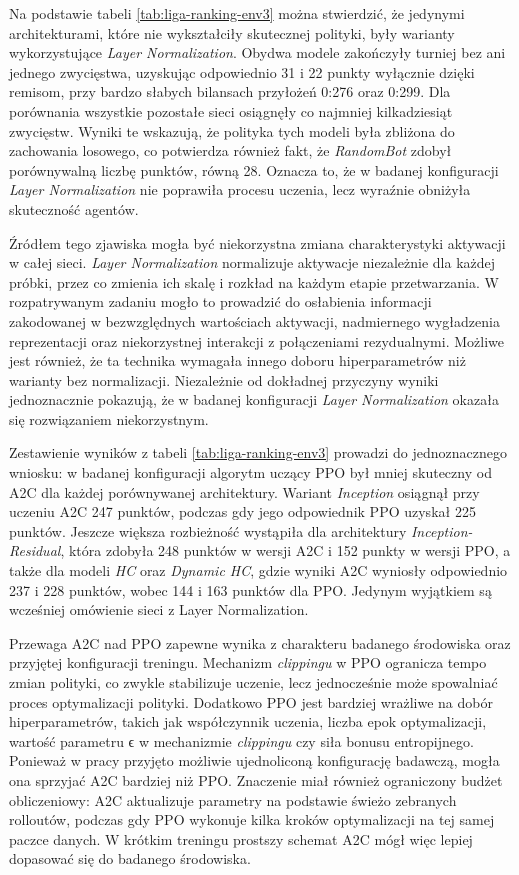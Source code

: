 Na podstawie tabeli \ref{tab:liga-ranking-env3} można stwierdzić, że jedynymi architekturami, które nie wykształciły skutecznej polityki, były warianty wykorzystujące \textit{Layer Normalization}. Obydwa modele zakończyły turniej bez ani jednego zwycięstwa, uzyskując odpowiednio 31 i 22 punkty wyłącznie dzięki remisom, przy bardzo słabych bilansach przyłożeń 0:276 oraz 0:299. Dla porównania wszystkie pozostałe sieci osiągnęły co najmniej kilkadziesiąt zwycięstw. Wyniki te wskazują, że polityka tych modeli była zbliżona do zachowania losowego, co potwierdza również fakt, że \textit{RandomBot} zdobył porównywalną liczbę punktów, równą 28. Oznacza to, że w badanej konfiguracji \textit{Layer Normalization} nie poprawiła procesu uczenia, lecz wyraźnie obniżyła skuteczność agentów.

Źródłem tego zjawiska mogła być niekorzystna zmiana charakterystyki aktywacji w całej sieci. \textit{Layer Normalization} normalizuje aktywacje niezależnie dla każdej próbki, przez co zmienia ich skalę i rozkład na każdym etapie przetwarzania. W rozpatrywanym zadaniu mogło to prowadzić do osłabienia informacji zakodowanej w bezwzględnych wartościach aktywacji, nadmiernego wygładzenia reprezentacji oraz niekorzystnej interakcji z połączeniami rezydualnymi. Możliwe jest również, że ta technika wymagała innego doboru hiperparametrów niż warianty bez normalizacji. Niezależnie od dokładnej przyczyny wyniki jednoznacznie pokazują, że w badanej konfiguracji \textit{Layer Normalization} okazała się rozwiązaniem niekorzystnym.


Zestawienie wyników z tabeli \ref{tab:liga-ranking-env3} prowadzi do jednoznacznego wniosku: w badanej konfiguracji algorytm uczący PPO był mniej skuteczny od A2C dla każdej porównywanej architektury. Wariant \textit{Inception} osiągnął przy uczeniu A2C 247 punktów, podczas gdy jego odpowiednik PPO uzyskał 225 punktów. Jeszcze większa rozbieżność wystąpiła dla architektury \textit{Inception-Residual}, która zdobyła 248 punktów w wersji A2C i 152 punkty w wersji PPO, a także dla modeli \textit{HC} oraz \textit{Dynamic HC}, gdzie wyniki A2C wyniosły odpowiednio 237 i 228 punktów, wobec 144 i 163 punktów dla PPO. Jedynym wyjątkiem są wcześniej omówienie sieci z Layer Normalization.

Przewaga A2C nad PPO zapewne wynika z charakteru badanego środowiska oraz przyjętej konfiguracji treningu. Mechanizm \textit{clippingu} w PPO ogranicza tempo zmian polityki, co zwykle stabilizuje uczenie, lecz jednocześnie może spowalniać proces optymalizacji polityki. Dodatkowo PPO jest bardziej wrażliwe na dobór hiperparametrów, takich jak współczynnik uczenia, liczba epok optymalizacji, wartość parametru ϵ w mechanizmie \textit{clippingu} czy siła bonusu entropijnego. Ponieważ w pracy przyjęto możliwie ujednoliconą konfigurację badawczą, mogła ona sprzyjać A2C bardziej niż PPO. Znaczenie miał również ograniczony budżet obliczeniowy: A2C aktualizuje parametry na podstawie świeżo zebranych rolloutów, podczas gdy PPO wykonuje kilka kroków optymalizacji na tej samej paczce danych. W krótkim treningu prostszy schemat A2C mógł więc lepiej dopasować się do badanego środowiska. 


